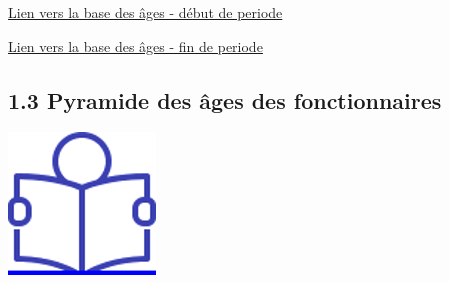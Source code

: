 \href{../Bases/Effectifs/Pyramide-des-ages-des-personnels_2009.csv}{Lien
vers la base des âges - début de periode}

\href{../Bases/Effectifs/Pyramide-des-ages-des-personnels_2013.csv}{Lien
vers la base des âges - fin de periode}

\hypertarget{pyramide-des-ages-des-fonctionnaires}{%
\subsection{1.3 Pyramide des âges des fonctionnaires
~}\label{pyramide-des-ages-des-fonctionnaires}}

\href{../Docs/Notices/fiche_2.odt}{\includegraphics{icones/Notice.png}}

